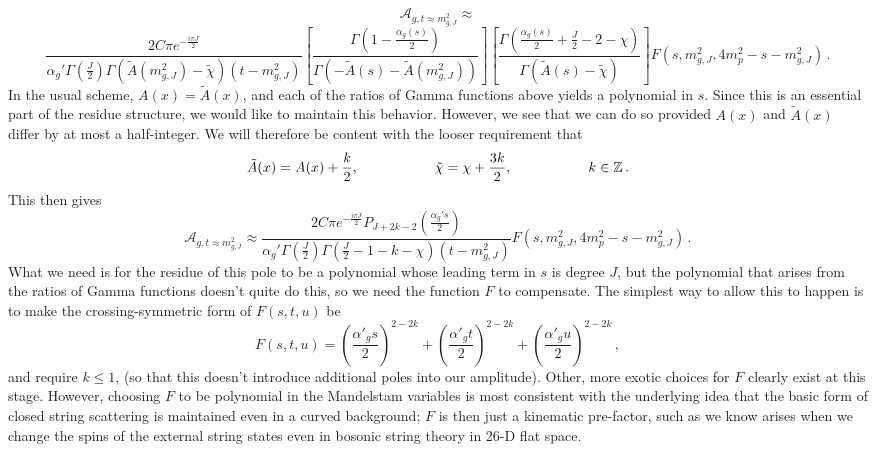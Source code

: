 \documentclass[aps, prd, preprintnumbers, floatfix, showpacs, showkeys, nofootinbib, 10pt]{revtex4-1}
\def\beq{\begin{equation}}
\def\eeq{\end{equation}}
\begin{document}
\beq
\mathcal{A}_{g, t \approx m_{g, J}^2} \approx
\eeq
\nopagebreak
$$
 \frac{2C\pi e^{-\frac{i\pi J}{2}}}{\alpha_g'\Gamma\left(\frac{J}{2}\right)\Gamma\left(\tilde{A}(m_{g, J}^2) - \tilde{\chi}\right)(t - m_{g, J}^2)}\left[\frac{\Gamma\left(1 - \frac{\alpha_g(s)}{2}\right)}{\Gamma\left(-\tilde{A}(s) - \tilde{A}(m_{g, J}^2)\right)}\right]\left[\frac{\Gamma\left(\frac{\alpha_g(s)}{2} + \frac{J}{2} - 2 - \chi\right)}{\Gamma\left(\tilde{A}(s) - \tilde{\chi}\right)}\right]F(s, m_{g, J}^2, 4m_p^2 - s - m_{g, J}^2) \, .
$$
In the usual scheme, $A(x) = \tilde{A}(x)$, and each of the ratios of Gamma functions above yields a polynomial in $s$.  Since this is an essential part of the residue structure, we would like to maintain this behavior.  However, we see that we can do so provided $A(x)$ and $\tilde{A}(x)$ differ by at most a half-integer.  We will therefore be content with the looser requirement that
\beq
\tilde{A}(x) = A(x) + \frac{k}{2}, 
\hspace{.75in} \tilde{\chi} = \chi + \frac{3k}{2}, \hspace{.75in} k \in \mathbb{Z} \, .
\eeq
This then gives
\beq
\mathcal{A}_{g, t \approx m_{g, J}^2} \approx
 \frac{2C\pi e^{-\frac{i\pi J}{2}}P_{J + 2k - 2}\left(\frac{\alpha_g' s}{2}\right)}{\alpha_g'\Gamma\left(\frac{J}{2}\right)\Gamma\left(\frac{J}{2} - 1 - k - \chi\right)(t - m_{g, J}^2)} F(s, m_{g, J}^2, 4m_p^2 - s - m_{g, J}^2) \, .
\eeq
What we need is for the residue of this pole to be a polynomial whose leading term in $s$ is degree $J$, but the polynomial that arises from the ratios of Gamma functions doesn't quite do this, so we need the function $F$ to compensate.  The simplest way to allow this to happen is to make the crossing-symmetric form of $F(s, t, u)$ be
\beq
F(s, t, u) = \left(\frac{\alpha'_g s}{2}\right)^{2 - 2k} + \left(\frac{\alpha'_g t}{2}\right)^{2 - 2k} + \left(\frac{\alpha'_g u}{2}\right)^{2 - 2k} \, ,
\eeq
and require $k \le 1$, (so that this doesn't introduce additional poles into our amplitude).  Other, more exotic choices for $F$ clearly exist at this stage.  However, choosing $F$ to be polynomial in the Mandelstam variables is most consistent with the underlying idea that the basic form of closed string scattering is maintained even in a curved background; $F$ is then just a kinematic pre-factor, such as we know arises when we change the spins of the external string states even in bosonic string theory in 26-D flat space.
\end{document}
